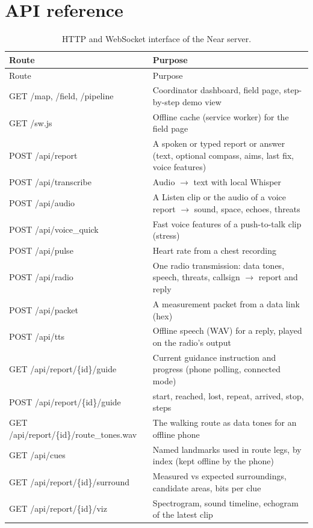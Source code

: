 \chapter{API reference}\label{app:api}

\begin{longtable}{>{\ttfamily\raggedright}p{6.2cm}p{8.6cm}}
\caption{HTTP and WebSocket interface of the Near server.}\label{tab:api}\\
\toprule
\normalfont Route & Purpose\\
\midrule
\endfirsthead
\toprule
\normalfont Route & Purpose\\
\midrule
\endhead
GET /map, /field, /pipeline & Coordinator dashboard, field page, step-by-step demo view\\
GET /sw.js & Offline cache (service worker) for the field page\\
POST /api/report & A spoken or typed report or answer (text, optional compass, aims, last fix, voice features)\\
POST /api/transcribe & Audio $\rightarrow$ text with local Whisper\\
POST /api/audio & A Listen clip or the audio of a voice report $\rightarrow$ sound, space, echoes, threats\\
POST /api/voice\_quick & Fast voice features of a push-to-talk clip (stress)\\
POST /api/pulse & Heart rate from a chest recording\\
POST /api/radio & One radio transmission: data tones, speech, threats, callsign $\rightarrow$ report and reply\\
POST /api/packet & A measurement packet from a data link (hex)\\
POST /api/tts & Offline speech (WAV) for a reply, played on the radio's output\\
GET /api/report/\{id\}/guide & Current guidance instruction and progress (phone polling, connected mode)\\
POST /api/report/\{id\}/guide & start, reached, lost, repeat, arrived, stop, steps\\
GET /api/report/\{id\}/route\_tones.wav & The walking route as data tones for an offline phone\\
GET /api/cues & Named landmarks used in route legs, by index (kept offline by the phone)\\
GET /api/report/\{id\}/surround & Measured vs expected surroundings, candidate areas, bits per clue\\
GET /api/report/\{id\}/viz & Spectrogram, sound timeline, echogram of the latest clip\\

\end{longtable}
